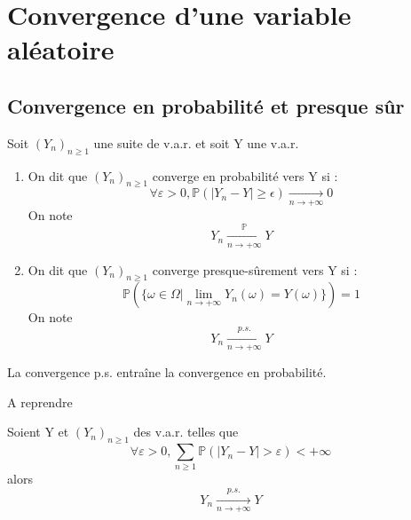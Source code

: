 \section{Convergence d'une variable aléatoire}
\subsection{Convergence en probabilité et presque sûr}
\begin{Def}
Soit $(Y_n)_{n\geq 1}$ une suite de v.a.r. et soit Y une v.a.r.
\begin{enumerate}
\item On dit que $(Y_n)_{n\geq1}$ converge en probabilité vers Y si : \[\forall \varepsilon>0, \mathbb{P}(|Y_n-Y|\geq \epsilon) \xrightarrow[n \to +\infty]{} 0\]
On note \[Y_n\xrightarrow[n \to +\infty]{\mathbb{P}}Y\]
\item On dit que $(Y_n)_{n\geq1}$ converge presque-sûrement vers Y si : \[\mathbb{P}(\{\omega\in\Omega|\lim_{n\to+\infty}Y_n(\omega)=Y(\omega)\})=1\]
On note \[Y_n\xrightarrow[n \to +\infty]{p.s.}Y\]
\end{enumerate}
\end{Def}

\begin{Prop}
La convergence p.s. entraîne la convergence en probabilité.
\end{Prop}

\begin{dem}
A reprendre
\end{dem}

\begin{Prop}
Soient Y et $(Y_n)_{n\geq 1}$ des v.a.r. telles que \[\forall \varepsilon>0, \sum_{n\geq 1} \mathbb{P}(|Y_n-Y|>\varepsilon)<+\infty\]
alors \[Y_n \xrightarrow[n\to +\infty]{p.s.} Y\]
\end{Prop}

